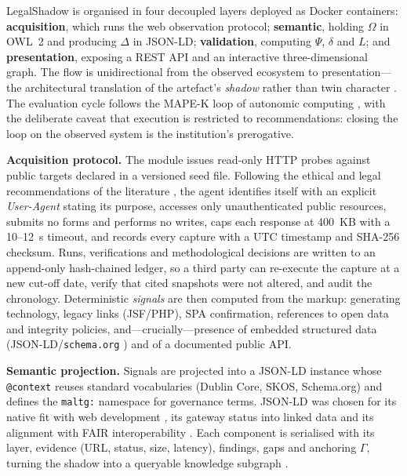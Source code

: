 \documentclass[engproc,proceedingpaper,submit,moreauthors]{Definitions/mdpi}
\begin{document}
LegalShadow is organised in four decoupled layers deployed as Docker containers: \textbf{acquisition}, which runs the web observation protocol; \textbf{semantic}, holding $\Omega$ in OWL~2 and producing $\Delta$ in JSON-LD; \textbf{validation}, computing $\Psi$, $\delta$ and $L$; and \textbf{presentation}, exposing a REST API and an interactive three-dimensional graph. The flow is unidirectional from the observed ecosystem to presentation---the architectural translation of the artefact's \emph{shadow} rather than twin character \cite{Kritzinger2018,Sepasgozar2021}. The evaluation cycle follows the MAPE-K loop of autonomic computing \cite{Kephart2003}, with the deliberate caveat that execution is restricted to recommendations: closing the loop on the observed system is the institution's prerogative.

\textbf{Acquisition protocol.} The module issues read-only HTTP probes against public targets declared in a versioned seed file. Following the ethical and legal recommendations of the literature \cite{Krotov2020}, the agent identifies itself with an explicit \emph{User-Agent} stating its purpose, accesses only unauthenticated public resources, submits no forms and performs no writes, caps each response at 400~KB with a 10--12~s timeout, and records every capture with a UTC timestamp and SHA-256 checksum. Runs, verifications and methodological decisions are written to an append-only hash-chained ledger, so a third party can re-execute the capture at a new cut-off date, verify that cited snapshots were not altered, and audit the chronology. Deterministic \emph{signals} are then computed from the markup: generating technology, legacy links (JSF/PHP), SPA confirmation, references to open data and integrity policies, and---crucially---presence of embedded structured data (JSON-LD/\texttt{schema.org} \cite{Guha2016}) and of a documented public API.

\textbf{Semantic projection.} Signals are projected into a JSON-LD instance whose \texttt{@context} reuses standard vocabularies (Dublin Core, SKOS, Schema.org) and defines the \texttt{maltg:} namespace for governance terms. JSON-LD was chosen for its native fit with web development \cite{Guha2016}, its gateway status into linked data \cite{Bizer2009} and its alignment with FAIR interoperability \cite{Wilkinson2016}. Each component is serialised with its layer, evidence (URL, status, size, latency), findings, gaps and anchoring $\Gamma$, turning the shadow into a queryable knowledge subgraph \cite{Hogan2021}.
\end{document}
